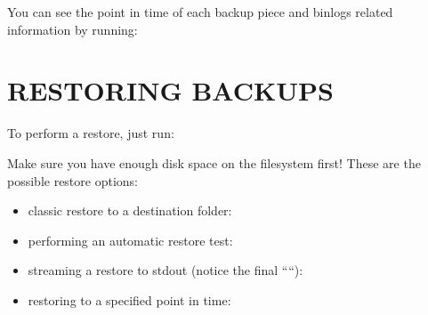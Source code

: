 \documentclass[letterpaper,10pt,english]{sphinxmanual}
\begin{document}
\sphinxAtStartPar
You can see the point in time of each backup piece and binlogs related information
by running:

\sphinxAtStartPar
{}


\section{RESTORING BACKUPS}
\label{\detokenize{mariadb-backup-manager:restoring-backups}}
\sphinxAtStartPar
To perform a restore, just run:

\sphinxAtStartPar
{}

\sphinxAtStartPar
Make sure you have enough disk space on the  filesystem first!
These are the possible restore options:
\begin{itemize}
\item {} 
\sphinxAtStartPar
classic restore to a destination folder:

\item {} 
\sphinxAtStartPar
performing an automatic restore test:

\item {} 
\sphinxAtStartPar
streaming a restore to stdout (notice the final “\sphinxhyphen{}“):

\item {} 
\sphinxAtStartPar
restoring to a specified point in time:

\end{itemize}
\end{document}

